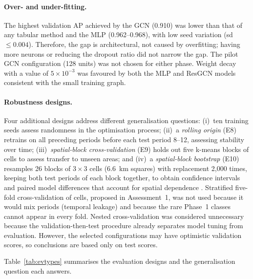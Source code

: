 \documentclass[11pt,a4paper]{report}
\begin{document}
\paragraph{Over- and under-fitting.} The highest validation AP achieved by the GCN (0.910) was lower than that of any tabular method and the MLP (0.962--0.968), with low seed variation (sd $\leq0.004$). Therefore, the gap is architectural, not caused by overfitting; having more neurons or reducing the dropout ratio did not narrow the gap. The pilot GCN configuration (128 units) was not chosen for either phase. Weight decay with a value of $5\times10^{-3}$ was favoured by both the MLP and ResGCN models consistent with the small training graph.

\paragraph{Robustness designs.} Four additional designs address different generalisation questions: (i)~ten training seeds assess randomness in the optimisation process; (ii)~a \emph{rolling origin} (E8) retrains on all preceding periods before each test period 8--12, assessing stability over time; (iii)~\emph{spatial-block cross-validation} (E9) holds out five k-means blocks of cells to assess transfer to unseen areas; and (iv)~a \emph{spatial-block bootstrap} (E10) resamples 26 blocks of \(3\times3\) cells (6.6~km squares) with replacement 2,000 times, keeping both test periods of each block together, to obtain confidence intervals and paired model differences that account for spatial dependence \citep{roberts2017}. Stratified five-fold cross-validation of cells, proposed in Assessment~1, was not used because it would mix periods (temporal leakage) and because the rare Phase~1 classes cannot appear in every fold. Nested cross-validation was considered unnecessary because the validation-then-test procedure already separates model tuning from evaluation. However, the selected configurations may have optimistic validation scores, so conclusions are based only on test scores.



Table~\ref{tab:evtypes} summarises the evaluation designs and the generalisation question each answers.
\end{document}
